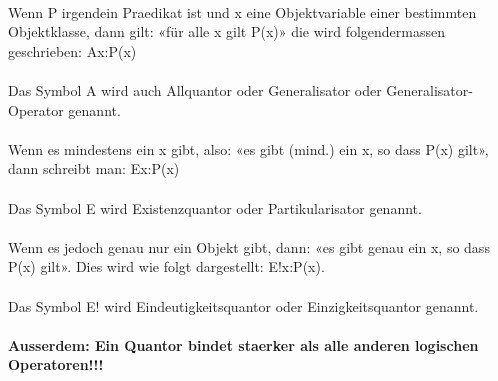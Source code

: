 \documentclass[../gruppenarbeit_1.tex]{subfiles}
\begin{document}
\\Wenn P irgendein Praedikat ist und x eine Objektvariable einer bestimmten Objektklasse, dann gilt: «für alle x gilt P(x)» die wird folgendermassen geschrieben: Ax:P(x)
\\
\\Das Symbol A wird auch Allquantor oder Generalisator oder Generalisator-Operator genannt.
\\
\\Wenn es mindestens ein x gibt, also: «es gibt (mind.) ein x, so dass P(x) gilt», dann schreibt man: Ex:P(x)
\\
\\Das Symbol E wird Existenzquantor oder Partikularisator genannt.
\\
\\Wenn es jedoch genau nur ein Objekt gibt, dann: «es gibt genau ein x, so dass P(x) gilt». Dies wird wie folgt dargestellt: E!x:P(x).
\\
\\Das Symbol E! wird Eindeutigkeitsquantor oder Einzigkeitsquantor genannt.
\\
\\\textbf{Ausserdem: Ein Quantor bindet staerker als alle anderen logischen Operatoren!!!}
\\
\end{document}
